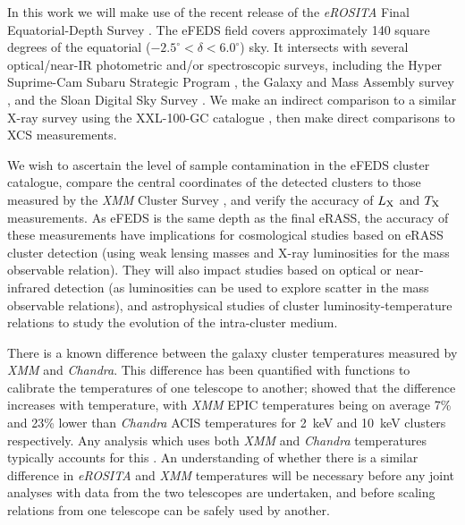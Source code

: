 \documentclass[fleqn,usenatbib]{mnras}
\begin{document}
In this work we will make use of the recent release of the {\em eROSITA} Final Equatorial-Depth Survey \citep[eFEDS,][]{efedscat}. The eFEDS field covers approximately 140 square degrees of the equatorial ($-2.5^{\circ}<\delta<6.0^{\circ}$) sky. It intersects with several optical/near-IR photometric and/or spectroscopic surveys, including the Hyper Suprime-Cam Subaru Strategic Program \citep[HSC SSP,][]{hscsurvey}, the Galaxy and Mass Assembly survey \citep[GAMA,][]{gamasurvey}, and the Sloan Digital Sky Survey \citep[SDSS,][]{sdss}. We make an indirect comparison to a similar X-ray survey using the XXL-100-GC catalogue \citep[][]{xxlgc100}, then make direct comparisons to XCS measurements.

We wish to ascertain the level of sample contamination in the eFEDS cluster catalogue, compare the central coordinates of the detected clusters to those measured by the {\em XMM} Cluster Survey \citep[XCS, ][]{xcsfoundation}, and verify the accuracy of $L_{\rm{X}}$ and $T_{\rm{X}}$ measurements. 
As eFEDS is the same depth as the final eRASS, the accuracy of these measurements have implications for cosmological studies based on eRASS cluster detection (using weak lensing masses and X-ray luminosities for the mass observable relation). They will also impact studies based on optical or near-infrared detection (as luminosities can be used to explore scatter in the mass observable relations), and astrophysical studies of cluster luminosity-temperature relations to study the evolution of the intra-cluster medium. 

There is a known difference between the galaxy cluster temperatures measured by {\em XMM} and {\em Chandra}. This difference has been quantified with functions to calibrate the temperatures of one telescope to another; \cite{xmmchandracal} showed that the difference increases with temperature, with {\em XMM} EPIC temperatures being on average 7\% and 23\% lower than {\em Chandra} ACIS temperatures for 2~keV and 10~keV clusters respectively. Any analysis which uses both {\em XMM} and {\em Chandra} temperatures typically accounts for this \citep[e.g.,][]{farahixmmchandra,mikgasxmmchandra}. An understanding of whether there is a similar difference in {\em eROSITA} and {\em XMM} temperatures will be necessary before any joint analyses with data from the two telescopes are undertaken, and before scaling relations from one telescope can be safely used by another. 

\end{document}
